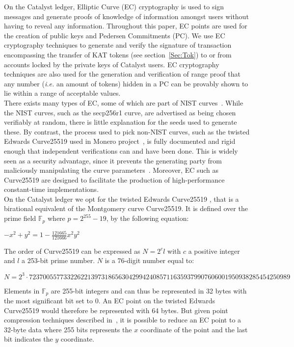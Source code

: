 On the Catalyst ledger, Elliptic Curve (EC) cryptography is used to sign messages and generate proofs of knowledge of information amongst users without having to reveal any information. Throughout this paper, EC points are used for the creation of public keys and Pedersen Commitments (PC). We use EC cryptography techniques to generate and verify the signature of transaction encompassing the transfer of KAT tokens (see section~\ref{Sec:Tok}) to or from accounts locked by the private keys of Catalyst users. EC cryptography techniques are also used for the generation and verification of range proof that any number (\textit{i.e.} an amount of tokens) hidden in a PC can be provably shown to lie within a range of acceptable values.\\

There exists many types of EC, some of which are part of NIST curves~\cite{Hankerson2011}. While the NIST curves, such as the secp256r1 curve, are advertised as being chosen verifiably at random, there is little explanation for the seeds used to generate these. By contrast, the process used to pick non-NIST curves, such as the twisted Edwards Curve25519 used in Monero project~\cite{monero}, is fully documented and rigid enough that independent verifications can and have been done. This is widely seen as a security advantage, since it prevents the generating party from maliciously manipulating the curve parameters~\cite{NSA}. Moreover, EC such as Curve25519 are designed to facilitate the production of high-performance constant-time implementations. \\

On the Catalyst ledger we opt for the twisted Edwards Curve25519 \cite{ed25519}, that is a birational equivalent of the Montgomery curve Curve25519. It is defined over the prime field $\mathbb{F}_{p}$ where $p = 2^{255} - 19$, by the following equation:
\begin{center}
$-x^2+y^2=1-\frac{121665}{121666}x^2y^2$
\end{center}
The order of Curve25519 can be expressed as $N=2^cl$ with $c$ a positive integer and $l$ a 253-bit prime number. $N$ is a 76-digit number equal to:
\begin{center}
\begin{footnotesize}
$N=2^3\cdot 7237005577332262213973186563042994240857116359379907606001950938285454250989$
\end{footnotesize}
\end{center}

Elements in $\mathbb{F}_{p}$ are 255-bit integers and can thus be represented in 32 bytes with the most significant bit set to 0. An EC point on the twisted Edwards Curve25519 would therefore be represented with 64 bytes. But given point compression techniques described in~\cite{monero}, it is possible to reduce an EC point to a 32-byte data where 255 bits represents the $x$ coordinate of the point and the last bit indicates the $y$ coordinate. \\

